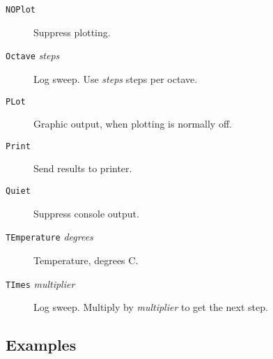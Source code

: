 \begin{description}





\item[{\tt NOPlot}] Suppress plotting.

\item[{\tt Octave} {\it steps}] Log sweep.  Use {\it
steps} steps per octave.

\item[{\tt PLot}] Graphic output, when plotting is
normally off.

\item[{\tt Print}] Send results to printer.

\item[{\tt Quiet}] Suppress console output.



\item[{\tt TEmperature} {\it degrees}] Temperature,
degrees C.

\item[{\tt TImes} {\it multiplier}] Log sweep.  Multiply
by {\it multiplier} to get the next step.


\end{description}
\subsection{Examples}


